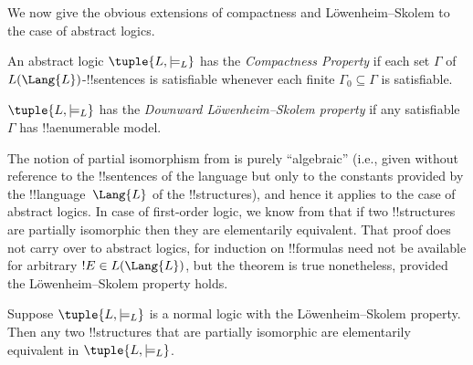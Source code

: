 \documentclass[../../../include/open-logic-section]{subfiles}
\begin{document}

We now give the obvious extensions of compactness and
L\"owenheim--Skolem to the case of abstract logics.

\begin{defn}
An abstract logic $\tuple{L, \models_L}$ has the \emph{Compactness
  Property} if each set $\Gamma$ of $L(\Lang{L})$-!!{sentence}s is
satisfiable whenever each finite $\Gamma_0 \subseteq \Gamma$ is
satisfiable.
\end{defn}

\begin{defn}
$\tuple{L, \models_L}$ has the \emph{Downward L\"owenheim--Skolem
  property} if any satisfiable $\Gamma$ has !!a{enumerable} model.
\end{defn}


The notion of partial isomorphism from
 is purely ``algebraic'' (i.e.,
given without reference to the !!{sentence}s of the language but only
to the constants provided by the !!{language}~$\Lang{L}$ of the
!!{structure}s), and hence it applies to the case of abstract
logics. In case of first-order logic, we know from
 that if two !!{structure}s are partially
isomorphic then they are elementarily equivalent. That proof does not
carry over to abstract logics, for induction on !!{formula}s need not
be available for arbitrary $!E \in L(\Lang{L})$, but the theorem is
true nonetheless, provided the L\"owenheim--Skolem property holds.

\begin{thm}
Suppose $\tuple{L, \models_L}$ is a normal logic with the
L\"owenheim--Skolem property. Then any two !!{structure}s that are
partially isomorphic are elementarily equivalent in $\tuple{L,
  \models_L}$.
\end{thm}
\end{document}
